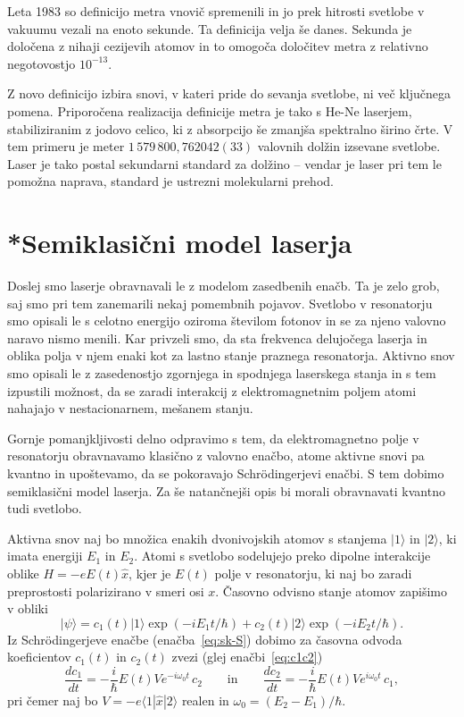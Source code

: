 Leta 1983 so definicijo metra vnovič spremenili in jo prek hitrosti svetlobe v
vakuumu vezali na enoto sekunde. Ta definicija velja še danes. Sekunda je določena
z nihaji cezijevih atomov in to omogoča določitev metra z relativno 
negotovostjo $10^{-13}$. 

Z novo definicijo izbira snovi, v kateri pride do sevanja svetlobe, ni več ključnega
pomena. Priporočena realizacija definicije metra je tako s He-Ne laserjem, 
stabiliziranim z jodovo celico, ki z absorpcijo še zmanjša spektralno širino črte.
V tem primeru je meter $1\,579\,800,762042(33)$ valovnih dolžin izsevane svetlobe. 
Laser je tako postal sekundarni standard za dolžino -- vendar je laser pri tem le pomožna 
naprava, standard je ustrezni molekularni prehod. 

\section{*Semiklasični model laserja}
\label{chap:semiklasicni}
Doslej smo laserje obravnavali le z modelom zasedbenih enačb. Ta je zelo
grob, saj smo pri tem zanemarili nekaj pomembnih pojavov. Svetlobo v 
resonatorju smo opisali le s celotno energijo oziroma številom fotonov in se za
njeno valovno naravo nismo menili. Kar privzeli smo, da sta frekvenca
delujočega laserja in oblika polja v njem enaki kot za lastno stanje
praznega resonatorja. Aktivno snov smo opisali le z zasedenostjo zgornjega
in spodnjega laserskega stanja in s tem izpustili možnost, da se zaradi
interakcij z elektromagnetnim poljem atomi nahajajo v nestacionarnem,
mešanem stanju.

Gornje pomanjkljivosti delno odpravimo s tem, da elektromagnetno polje v
resonatorju obravnavamo klasično z valovno enačbo, atome aktivne snovi pa
kvantno in upoštevamo, da se pokoravajo Schr\"odingerjevi enačbi. S tem dobimo 
semiklasični model laserja. Za še natančnejši opis bi morali obravnavati
kvantno tudi svetlobo.

Aktivna snov naj bo množica enakih dvonivojskih 
atomov s stanjema $|1\rangle$ in $|2\rangle$, ki imata energiji $E_1$ in $E_2$.
Atomi s svetlobo sodelujejo preko dipolne interakcije oblike $H = -eE(t)\hat{x}$, 
kjer je $E(t)$ polje v resonatorju, ki naj bo zaradi preprostosti 
polarizirano v smeri osi $x$. Časovno odvisno stanje atomov
zapišimo v obliki 
\begin{equation}  \label{5.45}
|\psi\rangle=c_1(t)|1\rangle\exp(-iE_1t/\hbar)+
c_2(t)|2\rangle\exp(-iE_2t/\hbar).
\end{equation}
Iz Schr\"odingerjeve enačbe (enačba~\ref{eq:sk-S}) dobimo za časovna odvoda
koeficientov $c_1(t)$ in $c_2(t)$ zvezi
(glej enačbi~\ref{eq:c1c2})
\begin{equation}
\frac{d c_1}{dt}=-\frac{i}{\hbar} E(t)V e^{-i\omega_0 t}\, c_2 
\qquad \mathrm{in} \qquad
\frac{d c_2}{dt}=-\frac{i}{\hbar} E(t)V e^{i\omega_0 t}\, c_1,
\label{5.46}
\end{equation}
pri čemer naj bo $V = -e\langle1|\hat{x}|2\rangle$ realen in $\omega_0=(E_2-E_1)/\hbar$.

